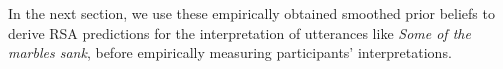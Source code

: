 \documentclass[10pt,letterpaper]{article}
\newcommand{\red}[1]{\textcolor{Red}{#1}}
\begin{document}
In the next section, we use these empirically obtained smoothed prior beliefs to derive RSA predictions for the interpretation of utterances like \emph{Some of the marbles sank}, before empirically measuring participants' interpretations.





 





%
\end{document}
